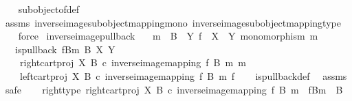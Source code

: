 \begin{isabellebody}
%
\isadelimproof
\ \ %
\endisadelimproof
%
\isatagproof
{}\isamarkupfalse%
\ subobject{\isacharunderscore}{\kern0pt}of{\isacharunderscore}{\kern0pt}def{}\isanewline
\ \ \isamarkupfalse%
\ assms\ inverse{\isacharunderscore}{\kern0pt}image{\isacharunderscore}{\kern0pt}subobject{\isacharunderscore}{\kern0pt}mapping{\isacharunderscore}{\kern0pt}mono\ inverse{\isacharunderscore}{\kern0pt}image{\isacharunderscore}{\kern0pt}subobject{\isacharunderscore}{\kern0pt}mapping{\isacharunderscore}{\kern0pt}type\isanewline
\ \ \isamarkupfalse%
\ force%
\endisatagproof
{\isafoldproof}%
%
\isadelimproof
\isanewline
%
\endisadelimproof
\isanewline
{}\isamarkupfalse%
\ inverse{\isacharunderscore}{\kern0pt}image{\isacharunderscore}{\kern0pt}pullback{\isacharcolon}{\kern0pt}\isanewline
\ \ \ {\isachardoublequoteopen}m\ {\isacharcolon}{\kern0pt}\ B\ {\isasymrightarrow}\ Y{\isachardoublequoteclose}\ {\isachardoublequoteopen}f\ {\isacharcolon}{\kern0pt}\ X\ {\isasymrightarrow}\ Y{\isachardoublequoteclose}\ {\isachardoublequoteopen}monomorphism\ m{\isachardoublequoteclose}\isanewline
\ \ \ {\isachardoublequoteopen}is{\isacharunderscore}{\kern0pt}pullback\ {\isacharparenleft}{\kern0pt}f\isactrlsup {\isacharminus}{\kern0pt}B{\isasymrparr}\isactrlbsub m\isactrlesub {\isacharparenright}{\kern0pt}\ B\ X\ Y\ \isanewline
\ \ \ \ {\isacharparenleft}{\kern0pt}right{\isacharunderscore}{\kern0pt}cart{\isacharunderscore}{\kern0pt}proj\ X\ B\ {\isasymcirc}\isactrlsub c\ inverse{\isacharunderscore}{\kern0pt}image{\isacharunderscore}{\kern0pt}mapping\ f\ B\ m{\isacharparenright}{\kern0pt}\ m\isanewline
\ \ \ \ {\isacharparenleft}{\kern0pt}left{\isacharunderscore}{\kern0pt}cart{\isacharunderscore}{\kern0pt}proj\ X\ B\ {\isasymcirc}\isactrlsub c\ inverse{\isacharunderscore}{\kern0pt}image{\isacharunderscore}{\kern0pt}mapping\ f\ B\ m{\isacharparenright}{\kern0pt}\ f{\isachardoublequoteclose}\isanewline
%
\isadelimproof
\ \ %
\endisadelimproof
%
\isatagproof
{}\isamarkupfalse%
\ is{\isacharunderscore}{\kern0pt}pullback{\isacharunderscore}{\kern0pt}def\ \isamarkupfalse%
\ assms\isanewline
{}\isamarkupfalse%
\ safe\isanewline
\ \ \isamarkupfalse%
\ right{\isacharunderscore}{\kern0pt}type{\isacharcolon}{\kern0pt}\ {\isachardoublequoteopen}right{\isacharunderscore}{\kern0pt}cart{\isacharunderscore}{\kern0pt}proj\ X\ B\ {\isasymcirc}\isactrlsub c\ inverse{\isacharunderscore}{\kern0pt}image{\isacharunderscore}{\kern0pt}mapping\ f\ B\ m\ {\isacharcolon}{\kern0pt}\ f\isactrlsup {\isacharminus}{\kern0pt}B{\isasymrparr}\isactrlbsub m\isactrlesub \ {\isasymrightarrow}\ B{\isachardoublequoteclose}\isanewline

\end{isabellebody}
